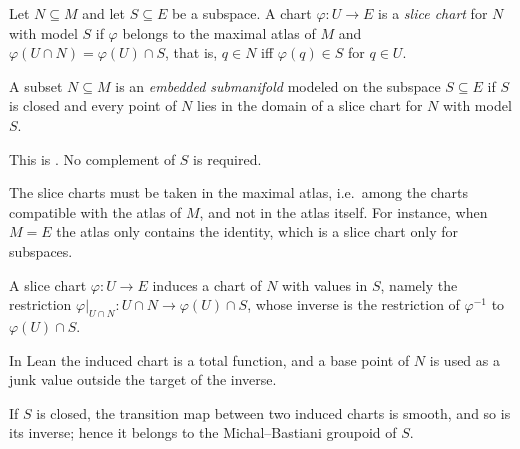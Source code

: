 \begin{definition}
  \label{def:sub-slice-chart}
  \leanok
  Let $N \subseteq M$ and let $S \subseteq E$ be a subspace. A chart $\varphi \colon U \to E$ is
  a \emph{slice chart} for $N$ with model $S$ if $\varphi$ belongs to the maximal atlas of $M$
  and $\varphi(U \cap N) = \varphi(U) \cap S$, that is, $q \in N$ iff $\varphi(q) \in S$ for
  $q \in U$.
\end{definition}

\begin{definition}
  \label{def:embedded-submanifold}
  \leanok
  A subset $N \subseteq M$ is an \emph{embedded submanifold} modeled on the subspace
  $S \subseteq E$ if $S$ is closed and every point of $N$ lies in the domain of a slice chart
  for $N$ with model $S$.
\end{definition}

This is \cite[Def.~3.1.10]{GN26}. No complement of $S$ is required.

\begin{remark}
  \label{rem:sub-maximal-atlas}
  The slice charts must be taken in the maximal atlas, i.e.\ among the charts compatible with
  the atlas of $M$, and not in the atlas itself. For instance, when $M = E$ the atlas only
  contains the identity, which is a slice chart only for subspaces.
\end{remark}

\begin{definition}
  \label{def:sub-induced-chart}
  \leanok
  A slice chart $\varphi \colon U \to E$ induces a chart of $N$ with values in $S$, namely the
  restriction $\varphi|_{U \cap N} \colon U \cap N \to \varphi(U) \cap S$, whose inverse is the
  restriction of $\varphi^{-1}$ to $\varphi(U) \cap S$.
\end{definition}

In Lean the induced chart is a total function, and a base point of $N$ is used as a junk value
outside the target of the inverse.

\begin{lemma}
  \label{lem:sub-transition}
  \leanok
  If $S$ is closed, the transition map between two induced charts is smooth, and so is its
  inverse; hence it belongs to the Michal--Bastiani groupoid of $S$.
\end{lemma}

